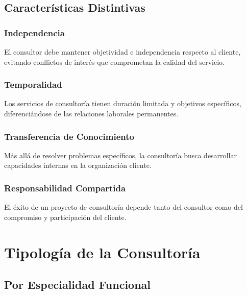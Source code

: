 \documentclass[12pt,letterpaper,oneside]{book}
\begin{document}
\subsection{Características Distintivas}

\subsubsection{Independencia}

El consultor debe mantener objetividad e independencia respecto al cliente, evitando conflictos de interés que comprometan la calidad del servicio.

\subsubsection{Temporalidad}

Los servicios de consultoría tienen duración limitada y objetivos específicos, diferenciándose de las relaciones laborales permanentes.

\subsubsection{Transferencia de Conocimiento}

Más allá de resolver problemas específicos, la consultoría busca desarrollar capacidades internas en la organización cliente.

\subsubsection{Responsabilidad Compartida}

El éxito de un proyecto de consultoría depende tanto del consultor como del compromiso y participación del cliente.

\section{Tipología de la Consultoría}

\subsection{Por Especialidad Funcional}
\end{document}
